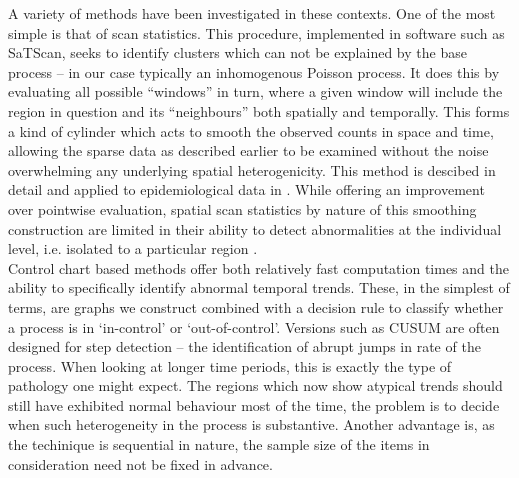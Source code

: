 \documentclass[11pt]{report}
\begin{document}
A variety of methods have been investigated in these contexts. One of the most simple is that of scan statistics. This procedure, implemented in software such as SaTScan, seeks to identify clusters which can not be explained by the base process -- in our case typically an inhomogenous Poisson process. It does this by evaluating all possible ``windows'' in turn, where a given window will include the region in question and its ``neighbours'' both spatially and temporally. This forms a kind of cylinder which acts to smooth the observed counts in space and time, allowing the sparse data as described earlier to be examined without the noise overwhelming any underlying spatial heterogenicity. This method is descibed in detail and applied to epidemiological data in \citet{scan}. While offering an improvement over pointwise evaluation, spatial scan statistics by nature of this smoothing construction are limited in their ability to detect abnormalities at the individual level, i.e. isolated to a particular region \citep{baystdetect}.  \\

Control chart based methods offer both relatively fast computation times and the ability to specifically identify abnormal temporal trends. These, in the simplest of terms, are graphs we construct combined with a decision rule to classify whether a process is in `in-control' or `out-of-control'. Versions such as CUSUM are often designed for step detection -- the identification of abrupt jumps in rate of the process. When looking at longer time periods, this is exactly the type of pathology one might expect. The regions which now show atypical trends should still have exhibited normal behaviour most of the time, the problem is to decide when such heterogeneity in the process is substantive.  Another advantage is, as the techinique is sequential in nature, the sample size of the items in consideration need not be fixed in advance.  \\
\end{document}
